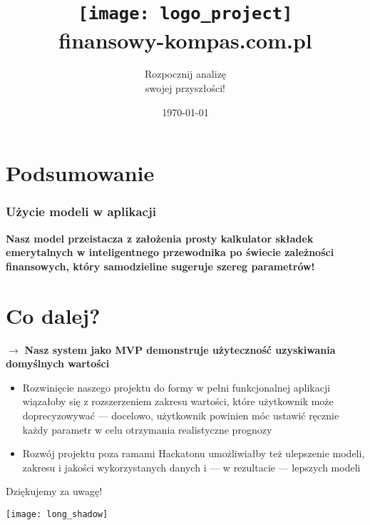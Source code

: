 \documentclass{beamer}
\title{\texttt{[image: logo\_project]}\\[1em] finansowy-kompas.com.pl}
\subtitle{Rozpocznij analizę\\ swojej przyszłości! \\[-2em]}
\institute{\texttt{[image: long\_shadow]}\\ Kwarta}
\date{\today}
\begin{document}








\section{Podsumowanie}

\begin{frame}
    \frametitle{Użycie modeli w aplikacji}
    \textbf{Nasz model przeistacza z założenia prosty kalkulator składek emerytalnych
    w inteligentnego przewodnika po świecie zależności finansowych, który samodzieline sugeruje
    szereg parametrów!}
    \\
    \pause
\end{frame}

\section{Co dalej?}

\begin{frame}
    $\rightarrow$ \textbf{Nasz system jako MVP demonstruje użyteczność uzyskiwania domyślnych wartości}
    \begin{itemize}
        \item Rozwinięcie naszego projektu do formy w pełni funkcjonalnej aplikacji wiązałoby się
z rozszerzeniem zakresu wartości, które użytkownik może doprecyzowywać --- docelowo,
użytkownik powinien móc ustawić ręcznie każdy parametr w celu otrzymania realistyczne
prognozy
        \item Rozwój projektu poza ramami Hackatonu umożliwiałby też ulepszenie modeli, zakresu i jakości wykorzystanych danych
i --- w rezultacie --- lepszych modeli
    \end{itemize}
\end{frame}



\begin{frame}[plain]
\Huge Dziękujemy za uwagę!

\vspace{1em}
\texttt{[image: long\_shadow]}
\end{frame}
\end{document}
